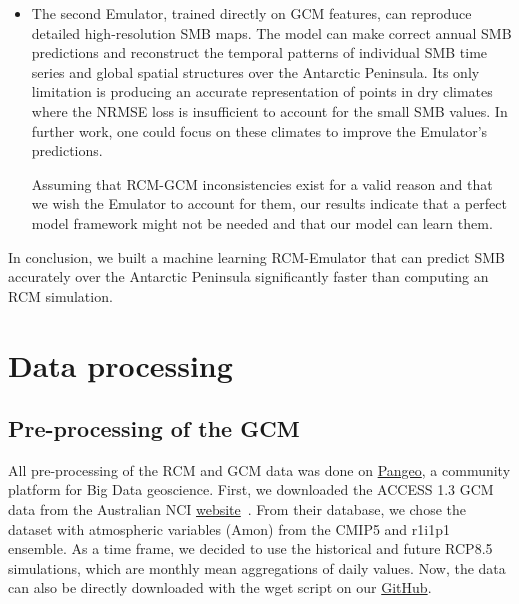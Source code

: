 \documentclass[a4paper,11pt,oneside]{report}
\begin{document}
\begin{itemize}
\begin{itemize}
        \item The second Emulator, trained directly on GCM features, can reproduce detailed high-resolution SMB maps. The model can make correct annual SMB predictions and reconstruct the temporal patterns of individual SMB time series and global spatial structures over the Antarctic Peninsula. Its only limitation is producing an accurate representation of points in dry climates where the NRMSE loss is insufficient to account for the small SMB values. In further work, one could focus on these climates to improve the Emulator's predictions. 
        
        Assuming that RCM-GCM inconsistencies exist for a valid reason and that we wish the Emulator to account for them, our results indicate that a perfect model framework might not be needed and that our model can learn them.  
    \end{itemize}
\end{itemize}
In conclusion, we built a machine learning RCM-Emulator that can predict SMB accurately over the Antarctic Peninsula significantly faster than computing an RCM simulation. 


\cleardoublepage
{}
{}
\printbibliography
\appendix

\chapter{Data processing}

\section{Pre-processing of the GCM}\label{sec:preproc-GCM}

All pre-processing of the RCM and GCM data was done on \href{https://pangeo.io/about.html}{Pangeo}, a community platform for Big Data geoscience. First, we downloaded the ACCESS 1.3 GCM data from the Australian NCI \href{https://esgf.nci.org.au/search/esgf-nci/}{website}~\cite{NCI}. From their database, we chose the dataset with atmospheric variables (Amon) from the CMIP5 and r1i1p1 ensemble. As a time frame, we decided to use the historical and future RCP8.5 simulations, which are monthly mean aggregations of daily values. Now, the data can also be directly downloaded with the wget script on our \href{https://github.com/marvande/master-thesis}{GitHub}. 
\end{document}
